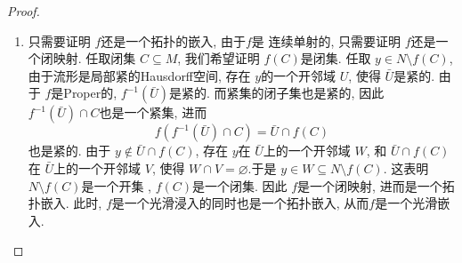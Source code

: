 \documentclass[../main.tex]{subfiles}
\begin{document}
\begin{proof}
    
\begin{enumerate}
    \item[a).] 只需要证明 \(  f  \)还是一个拓扑的嵌入, 由于\(  f  \)是 连续单射的, 只需要证明 \(  f  \)还是一个闭映射. 任取闭集 \(  C\subseteq M  \), 我们希望证明 \(  f\left( C \right)   \)是闭集. 任取 \(  y \in N\setminus f\left( C \right)   \), 由于流形是局部紧的Hausdorff空间, 存在 \(  y  \)的一个开邻域 \(  U  \), 使得 \(  \bar{U}  \)是紧的.    由于 \(  f  \)是Proper的,  \(  f^{-1} \left( \bar{U} \right)   \)是紧的. 而紧集的闭子集也是紧的, 因此 \(  f^{-1} \left( \bar{U} \right)\cap C   \)也是一个紧集, 进而 \[
    f\left( f^{-1} \left( \bar{U} \right)\cap C  \right)= \bar{U}\cap f\left( C \right) 
    \] 也是紧的. 由于 \(  y\not \in \bar{U}\cap f\left( C \right)   \), 存在 \(  y  \)在 \(  \bar{U}  \)上的一个开邻域 \(  W  \), 和 \(  \bar{U}\cap f\left( C \right)   \)在 \(  \bar{U}  \)上的一个开邻域 \(  V  \), 使得 \(  W\cap V= \varnothing  \).于是 \(  y\in W\subseteq N\setminus f\left( C \right)   \). 这表明 \(  N\setminus f\left( C \right)   \)是一个开集 ,  \(  f\left( C \right)   \)是一个闭集. 因此 \(  f  \)是一个闭映射, 进而是一个拓扑嵌入. 此时,  \(  f  \)是一个光滑浸入的同时也是一个拓扑嵌入, 从而\(  f  \)是一个光滑嵌入.              
    

\end{enumerate}
\end{proof}
\end{document}
